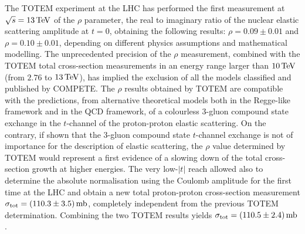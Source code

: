 The TOTEM experiment at the LHC has performed the first measurement at $\sqrt s = 13\,{\rm TeV}$ of the $\rho$ parameter, the real to imaginary ratio of the nuclear elastic scattering amplitude at $t=0$, obtaining the following results: $\rho = 0.09 \pm 0.01$ and $\rho = 0.10 \pm 0.01$, depending on different physics assumptions and mathematical modelling. The unprecedented precision of the $\rho$ measurement, combined with the TOTEM total cross-section measurements in an energy range larger than $10\,{\rm TeV}$ (from $2.76$ to $13\,{\rm TeV}$), has implied the exclusion of all the models classified and published by COMPETE. The $\rho$ results obtained by TOTEM are compatible with the predictions, from alternative theoretical models both in the Regge-like framework and in the QCD framework, of a colourless 3-gluon compound state exchange in the $t$-channel of the proton-proton elastic scattering. On the contrary, if shown that the 3-gluon compound state $t$-channel exchange is not of importance for the description of elastic scattering, the $\rho$ value determined by TOTEM would represent a first evidence of a slowing down of the total cross-section growth at higher energies.
%
The very low-$|t|$ reach allowed also to determine the absolute normalisation using the Coulomb amplitude for the first time at the LHC and obtain a new total proton-proton cross-section measurement $\sigma_{\rm tot} = (110.3 \pm 3.5)\,{\rm mb}$, completely independent from the previous TOTEM determination. Combining the two TOTEM results yields $\sigma_{\rm tot} = (110.5 \pm 2.4)\,{\rm mb}$.
